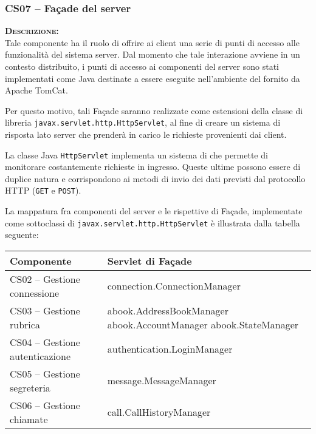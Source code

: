 \subsubsection{CS07 -- Façade del server}\label{sec:cs07}
\begin{description}
	\item{\scshape\bfseries Descrizione:}\\
Tale componente ha il ruolo di offrire ai client una serie di punti di accesso alle funzionalità del sistema server. Dal momento che tale interazione avviene in un contesto distribuito, i punti di accesso ai componenti del server sono stati implementati come  Java destinate a essere eseguite nell'ambiente del  fornito da Apache TomCat.

Per questo motivo, tali Façade saranno realizzate come estensioni della classe di libreria \texttt{javax.servlet.http.HttpServlet}, al fine di creare un sistema di risposta lato server che prenderà in carico le richieste provenienti dai client.

La classe Java \texttt{HttpServlet} implementa un sistema di  che permette di monitorare costantemente richieste in ingresso. Queste ultime possono essere di duplice natura e corrispondono ai metodi di invio dei dati previsti dal protocollo HTTP (\texttt{GET} e \texttt{POST}).

La mappatura fra componenti del server e le rispettive  di Façade, implementate come sottoclassi di \texttt{javax.servlet.http.HttpServlet} è illustrata dalla tabella seguente:
\begin{center}
\begin{tabular}{>{\sffamily}l>{\ttfamily}p{}}
\toprule
\textbf{\rmfamily Componente} & \textbf{\rmfamily Servlet di Façade}\\
\midrule
CS02 -- Gestione connessione & connection.ConnectionManager\\
CS03 -- Gestione rubrica & abook.AddressBookManager abook.AccountManager abook.StateManager\\
CS04 -- Gestione autenticazione & authentication.LoginManager\\
CS05 -- Gestione segreteria & message.MessageManager\\
CS06 -- Gestione chiamate & call.CallHistoryManager\\
\bottomrule
\end{tabular}
\end{center}


\end{description}
